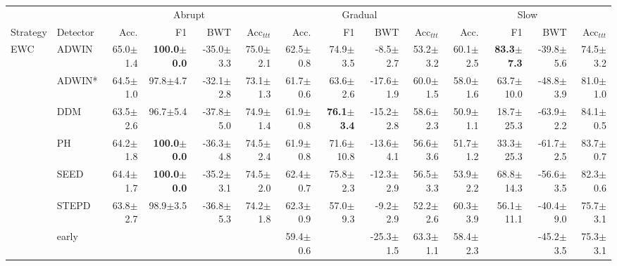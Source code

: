 \begin{tabular}{llrrrrrrrrrrrr}
\toprule
 & & \multicolumn{4}{c}{Abrupt} & \multicolumn{4}{c}{Gradual} & \multicolumn{4}{c}{Slow} \\
\cmidrule(lr){3-6}\cmidrule(lr){7-10}\cmidrule(lr){11-14}
Strategy & Detector & Acc. & F1 & BWT & Acc$_{ttt}$ & Acc. & F1 & BWT & Acc$_{ttt}$ & Acc. & F1 & BWT & Acc$_{ttt}$ \\
\midrule
\multirow[t]{9}{*}{EWC} & ADWIN & 65.0\tiny{$\pm$1.4} & \textbf{100.0\tiny{$\pm$0.0}} & -35.0\tiny{$\pm$3.3} & 75.0\tiny{$\pm$2.1} & 62.5\tiny{$\pm$0.8} & 74.9\tiny{$\pm$3.5} & -8.5\tiny{$\pm$2.7} & 53.2\tiny{$\pm$3.2} & 60.1\tiny{$\pm$2.5} & \textbf{83.3\tiny{$\pm$7.3}} & -39.8\tiny{$\pm$5.6} & 74.5\tiny{$\pm$3.2} \\
 & ADWIN* & 64.5\tiny{$\pm$1.0} & 97.8\tiny{$\pm$4.7} & -32.1\tiny{$\pm$2.8} & 73.1\tiny{$\pm$1.3} & 61.7\tiny{$\pm$0.6} & 63.6\tiny{$\pm$2.6} & -17.6\tiny{$\pm$1.9} & 60.0\tiny{$\pm$1.5} & 58.0\tiny{$\pm$1.6} & 63.7\tiny{$\pm$10.0} & -48.8\tiny{$\pm$3.9} & 81.0\tiny{$\pm$1.0} \\
 & DDM & 63.5\tiny{$\pm$2.6} & 96.7\tiny{$\pm$5.4} & -37.8\tiny{$\pm$5.0} & 74.9\tiny{$\pm$1.4} & 61.9\tiny{$\pm$0.8} & \textbf{76.1\tiny{$\pm$3.4}} & -15.2\tiny{$\pm$2.8} & 58.6\tiny{$\pm$2.3} & 50.9\tiny{$\pm$1.1} & 18.7\tiny{$\pm$25.3} & -63.9\tiny{$\pm$2.2} & 84.1\tiny{$\pm$0.5} \\
 & PH & 64.2\tiny{$\pm$1.8} & \textbf{100.0\tiny{$\pm$0.0}} & -36.3\tiny{$\pm$4.8} & 74.5\tiny{$\pm$2.4} & 61.9\tiny{$\pm$0.8} & 71.6\tiny{$\pm$10.8} & -13.6\tiny{$\pm$4.1} & 56.6\tiny{$\pm$3.6} & 51.7\tiny{$\pm$1.2} & 33.3\tiny{$\pm$25.3} & -61.7\tiny{$\pm$2.5} & 83.7\tiny{$\pm$0.7} \\
 & SEED & 64.4\tiny{$\pm$1.7} & \textbf{100.0\tiny{$\pm$0.0}} & -35.2\tiny{$\pm$3.1} & 74.5\tiny{$\pm$2.0} & 62.4\tiny{$\pm$0.7} & 75.8\tiny{$\pm$2.3} & -12.3\tiny{$\pm$2.9} & 56.5\tiny{$\pm$3.3} & 53.9\tiny{$\pm$2.2} & 68.8\tiny{$\pm$14.3} & -56.6\tiny{$\pm$3.5} & 82.3\tiny{$\pm$0.6} \\
 & STEPD & 63.8\tiny{$\pm$2.7} & 98.9\tiny{$\pm$3.5} & -36.8\tiny{$\pm$5.3} & 74.2\tiny{$\pm$1.8} & 62.3\tiny{$\pm$0.9} & 57.0\tiny{$\pm$9.3} & -9.2\tiny{$\pm$2.9} & 52.2\tiny{$\pm$2.6} & 60.3\tiny{$\pm$3.9} & 56.1\tiny{$\pm$11.1} & -40.4\tiny{$\pm$9.0} & 75.7\tiny{$\pm$3.1} \\
 & early &  &  &  &  & 59.4\tiny{$\pm$0.6} &  & -25.3\tiny{$\pm$1.5} & 63.3\tiny{$\pm$1.1} & 58.4\tiny{$\pm$2.3} &  & -45.2\tiny{$\pm$3.5} & 75.3\tiny{$\pm$3.1} \\

\end{tabular}
